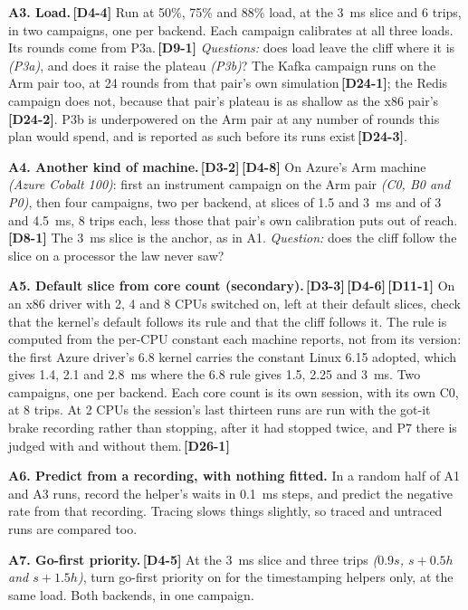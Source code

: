 \documentclass[11pt]{article}
\newcommand{\gl}[1]{{\color{soft}\itshape\small (#1)}}
\newcommand{\chg}[1]{\,{\color{chgcol}\bfseries\footnotesize[#1]}}
\newcommand{\chgold}[1]{\,{\color{oldcol}\bfseries\footnotesize[#1]}}
\begin{document}
\textbf{A3. Load.}\chgold{D4-4} Run at 50\%, 75\% and 88\% load, at the 3~ms slice and 6 trips, in two campaigns, one per backend. Each campaign calibrates at all three loads. Its rounds come from P3a.\chgold{D9-1} \emph{Questions:} does load leave the cliff where it is \gl{P3a}, and does it raise the plateau \gl{P3b}? The Kafka campaign runs on the Arm pair too, at 24 rounds from that pair's own simulation\chgold{D24-1}; the Redis campaign does not, because that pair's plateau is as shallow as the x86 pair's\chgold{D24-2}. P3b is underpowered on the Arm pair at any number of rounds this plan would spend, and is reported as such before its runs exist\chgold{D24-3}.

\textbf{A4. Another kind of machine.}\chgold{D3-2}\chgold{D4-8} On Azure's Arm machine \gl{Azure Cobalt 100}: first an instrument campaign on the Arm pair \gl{C0, B0 and P0}, then four campaigns, two per backend, at slices of 1.5 and 3~ms and of 3 and 4.5~ms, 8 trips each, less those that pair's own calibration puts out of reach.\chgold{D8-1} The 3~ms slice is the anchor, as in A1. \emph{Question:} does the cliff follow the slice on a processor the law never saw?

\textbf{A5. Default slice from core count (secondary).}\chgold{D3-3}\chgold{D4-6}\chgold{D11-1} On an x86 driver with 2, 4 and 8 CPUs switched on, left at their default slices, check that the kernel's default follows its rule and that the cliff follows it. The rule is computed from the per-CPU constant each machine reports, not from its version: the first Azure driver's 6.8 kernel carries the constant Linux 6.15 adopted, which gives 1.4, 2.1 and 2.8~ms where the 6.8 rule gives 1.5, 2.25 and 3~ms. Two campaigns, one per backend. Each core count is its own session, with its own C0, at 8 trips. At 2 CPUs the session's last thirteen runs are run with the got-it brake recording rather than stopping, after it had stopped twice, and P7 there is judged with and without them.\chg{D26-1}

\textbf{A6. Predict from a recording, with nothing fitted.} In a random half of A1 and A3 runs, record the helper's waits in 0.1~ms steps, and predict the negative rate from that recording. Tracing slows things slightly, so traced and untraced runs are compared too.

\textbf{A7. Go-first priority.}\chgold{D4-5} At the 3~ms slice and three trips \gl{$0.9s$, $s + 0.5h$ and $s + 1.5h$}, turn go-first priority on for the timestamping helpers only, at the same load. Both backends, in one campaign.
\end{document}
